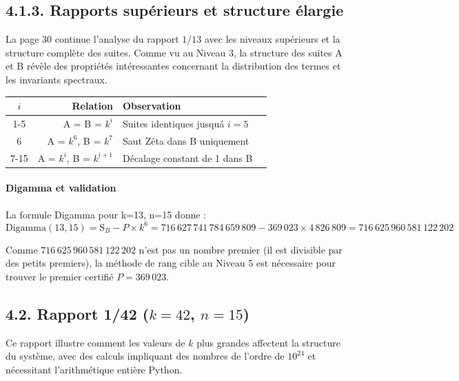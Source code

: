 \documentclass[11pt,a4paper]{article}
\newcommand{\SB}{\mathrm{S}_B}
\begin{document}
\subsection*{4.1.3. Rapports supérieurs et structure élargie}

La page 30 continue l'analyse du rapport $1/13$ avec les niveaux supérieurs et la structure complète des suites. Comme vu au Niveau 3, la structure des suites A et B révèle des propriétés intéressantes concernant la distribution des termes et les invariants spectraux.

\begin{center}
\small
\begin{tabular}{@{}c r l l@{}}
\toprule
\rowcolor{spectralgris}
\boldmath$i$ & \textbf{Relation} & \textbf{Observation} \\
\midrule
1-5  & A = B = $k^{i}$ & Suites identiques jusqu\'a $i=5$ \\
6    & A = $k^{6}$, B = $k^{7}$ & Saut Zêta dans B uniquement \\
7-15 & A = $k^{i}$, B = $k^{i+1}$ & Décalage constant de 1 dans B \\
\bottomrule
\end{tabular}
\end{center}

\vspace{0.3cm}

\paragraph{Digamma et validation}

La formule Digamma pour k=13, n=15 donne :
$$\text{Digamma}(13,15) = \SB - P \times k^{6} = 716\,627\,741\,784\,659\,809 - 369\,023 \times 4\,826\,809 = 716\,625\,960\,581\,122\,202$$

Comme $716\,625\,960\,581\,122\,202$ n'est pas un nombre premier (il est divisible par des petits premiers), la méthode de rang cible au Niveau 5 est nécessaire pour trouver le premier certifié $P = 369\,023$.

\vspace{0.5cm}

\subsection*{4.2. Rapport 1/42 (\texorpdfstring{$k = 42$}{k = 42}, \texorpdfstring{$n = 15$}{n = 15})}
Ce rapport illustre comment les valeurs de $k$ plus grandes affectent la structure du système, avec des calculs impliquant des nombres de l'ordre de $10^{24}$ et nécessitant l'arithmétique entière Python.
\end{document}
